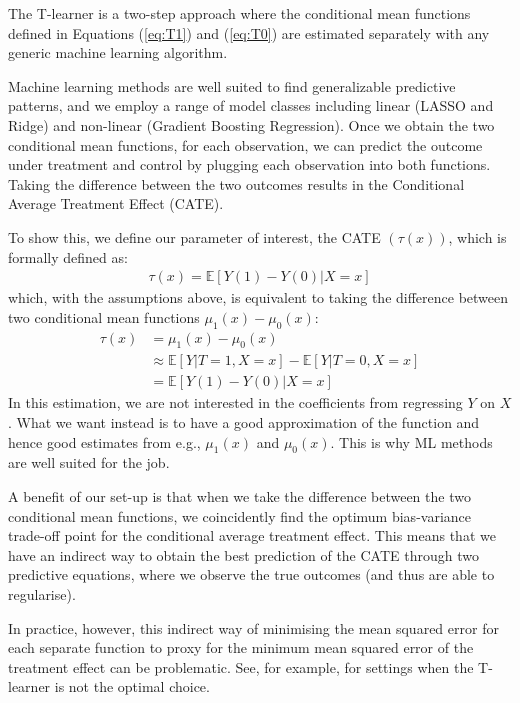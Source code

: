 \documentclass[12pt, a4paper]{article}
\begin{document}
The T-learner is a two-step approach where the conditional mean functions defined in Equations (\ref{eq:T1}) and (\ref{eq:T0}) are estimated separately with any generic machine learning algorithm.

Machine learning methods are well suited to find generalizable predictive patterns, and we employ a range of model classes including linear (LASSO and Ridge) and non-linear (Gradient Boosting Regression). Once we obtain the two conditional mean functions, for each observation, we can predict the outcome under treatment and control by plugging each observation into both functions. Taking the difference between the two outcomes results in the Conditional Average Treatment Effect (CATE).

To show this, we define our parameter of interest, the CATE $(\tau (x))$, which is formally defined as:
\begin{align}
\tau (x) = \mathbb{E}[Y(1) - Y(0) | X = x]
\end{align}
which, with the assumptions above, is equivalent to taking the difference between two conditional mean functions $\mu _1(x) - \mu _0(x)$:
\begin{align}
\tau (x) & = \mu _1(x) - \mu _0(x) \\
& \approx \mathbb{E}[Y | T = 1, X = x] - \mathbb{E}[Y | T = 0, X = x] \\
& = \mathbb{E}[Y(1) - Y(0) | X = x]
\end{align}
In this estimation, we are not interested in the coefficients from regressing $Y$ on $X$. What we want instead is to have a good approximation of the function and hence good estimates from e.g., $\mu _1(x)$ and $\mu _0(x)$. This is why ML methods are well suited for the job.

A benefit of our set-up is that when we take the difference between the two conditional mean functions, we coincidently find the optimum bias-variance trade-off point for the conditional average treatment effect. This means that we have an indirect way to obtain the best prediction of the CATE through two predictive equations, where we observe the true outcomes (and thus are able to regularise).

In practice, however, this indirect way of minimising the mean squared error for each separate function to proxy for the minimum mean squared error of the treatment effect can be problematic. See, for example, \cite{kunzel2019,kennedy2020} for settings when the T-learner is not the optimal choice.
\end{document}
